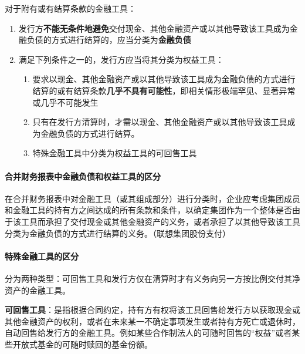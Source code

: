 \documentclass[UTF8,12pt]{ctexart}
\numberwithin{equation}{section} %
\numberwithin{figure}{section}
\numberwithin{table}{section}
\begin{document}
	对于附有或有结算条款的金融工具：
	\begin{enumerate}
		\item 发行方\textbf{不能无条件地避免}交付现金、其他金融资产或以其他导致该工具成为金融负债的方式进行结算的，应当分类为\textbf{金融负债}
		
		\item 满足下列条件之一的，发行方应当将其分类为权益工具：
		\begin{enumerate}
			\item 要求以现金、其他金融资产或以其他导致该工具成为金融负债的方式进行结算的或有结算条款\textbf{几乎不具有可能性}，即相关情形极端罕见、显著异常或几乎不可能发生
			
			\item 只有在发行方清算时，才需以现金、其他金融资产或以其他导致该工具成为金融负债的方式进行结算。
			
			\item 特殊金融工具中分类为权益工具的可回售工具
		\end{enumerate}
	\end{enumerate}
	
	\paragraph{合并财务报表中金融负债和权益工具的区分}
	在合并财务报表中对金融工具（或其组成部分）进行分类时，企业应考虑集团成员和金融工具的持有方之间达成的所有条款和条件，以确定集团作为一个整体是否由于该工具而承担了交付现金或其他金融资产的义务，或者承担了以其他导致该工具分类为金融负债的方式进行结算的义务。（联想集团股份支付）
	
	\paragraph{特殊金融工具的区分}
	分为两种类型：可回售工具和发行方仅在清算时才有义务向另一方按比例交付其净资产的金融工具。
	
	\textbf{可回售工具}：是指根据合同约定，持有方有权将该工具回售给发行方以获取现金或其他金融资产的权利，或者在未来某一不确定事项发生或者持有方死亡或退休时，自动回售给发行方的金融工具。例如某些合作制法人的可随时回售的“权益”或者某些开放式基金的可随时赎回的基金份额。
	
\end{document}
